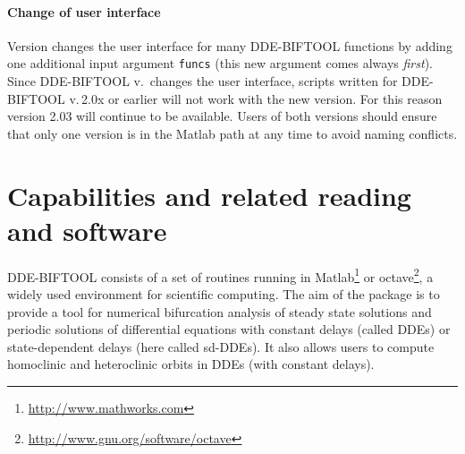 \documentclass[10pt]{scrartcl}
\newcommand{\DDEBIFCODE}{\textsc{DDE-BIFTOOL}}
\newcommand{\blist}[1]{\mbox{\lstinline!#1!}}
\begin{document}
\paragraph{Change of user interface}
Version \version{} changes the user interface for many \DDEBIFCODE{}
functions by adding one additional input argument \blist{funcs} (this
new argument comes always \emph{first}).  Since \DDEBIFCODE{}
v.\,\version{} changes the user interface, scripts written for
\DDEBIFCODE{} v.\,2.0x or earlier will not work with the new
version. For this reason version 2.03 will continue to be
available. Users of both versions should ensure that only one version
is in the Matlab path at any time to avoid naming conflicts.

\section{Capabilities and related reading and
  software}
\label{sec:intro}
 {\DDEBIFCODE} consists of a set of routines running in
Matlab\footnote{\url{http://www.mathworks.com}} \cite{Mat00} or
octave\footnote{\url{http://www.gnu.org/software/octave}}, a widely
used environment for scientific computing.  The aim of the package is
to provide a tool for numerical bifurcation analysis of steady state
solutions and periodic solutions of differential equations with
constant delays (called DDEs) or state-dependent delays (here called
sd-DDEs).  It also allows users to compute homoclinic and heteroclinic
orbits in DDEs (with constant delays).  
\end{document}
